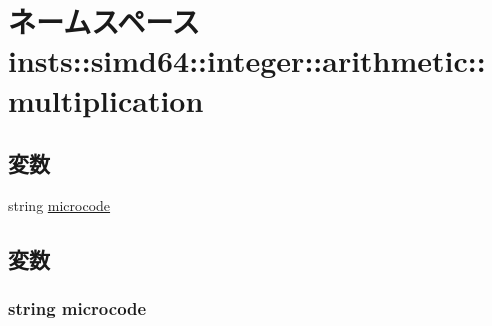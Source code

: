 \hypertarget{namespaceinsts_1_1simd64_1_1integer_1_1arithmetic_1_1multiplication}{
\section{ネームスペース insts::simd64::integer::arithmetic::multiplication}
\label{namespaceinsts_1_1simd64_1_1integer_1_1arithmetic_1_1multiplication}
}
\subsection*{変数}
\begin{DoxyCompactItemize}
\item 
string \hyperlink{namespaceinsts_1_1simd64_1_1integer_1_1arithmetic_1_1multiplication_a770f11a173e99389a8802f0107ed8f52}{microcode}
\end{DoxyCompactItemize}


\subsection{変数}
\hypertarget{namespaceinsts_1_1simd64_1_1integer_1_1arithmetic_1_1multiplication_a770f11a173e99389a8802f0107ed8f52}{
\subsubsection[{microcode}]{\setlength{\rightskip}{0pt plus 5cm}string {\bf microcode}}}
\label{namespaceinsts_1_1simd64_1_1integer_1_1arithmetic_1_1multiplication_a770f11a173e99389a8802f0107ed8f52}
